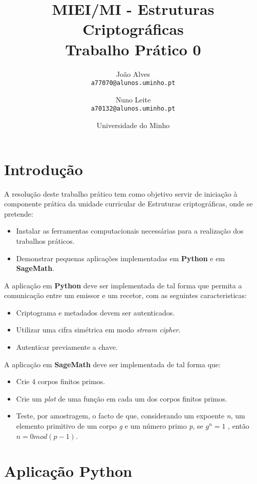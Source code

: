 \documentclass[11pt]{article}
\title{MIEI/MI - Estruturas Criptográficas\\
            \large Trabalho Prático 0}
\author{
        João Alves\\
        \texttt{a77070@alunos.uminho.pt}
        \and
        Nuno Leite\\
        \texttt{a70132@alunos.uminho.pt}
      }
\date{Universidade do Minho}
\begin{document}
    
    
    \maketitle
    
    
    \hypertarget{introduuxe7uxe3o}{%
\section{Introdução}\label{introduuxe7uxe3o}}

    A resolução deste trabalho prático tem como objetivo servir de iniciação
à componente prática da unidade curricular de Estruturas criptográficas,
onde se pretende:
\begin{itemize}
    \item Instalar as ferramentas computacionais necessárias
    para a realização dos trabalhos práticos. 
    \item Demonstrar pequenas
    aplicações implementadas em \textbf{Python} e em \textbf{SageMath}.
\end{itemize}

A aplicação em \textbf{Python} deve ser implementada de tal forma que
permita a comunicação entre um emissor e um recetor, com as seguintes
caracteristicas:
\begin{itemize}
    \item Criptograma e metadados devem ser autenticados.
    \item Utilizar uma cifra simétrica em modo \emph{stream cipher}. 
    \item Autenticar previamente a chave.
\end{itemize}


A aplicação em \textbf{SageMath} deve ser implementada de tal forma que:
\begin{itemize}
    \item Crie 4 corpos finitos primos.
    \item Crie um \emph{plot} de uma função em cada um dos corpos finitos primos. 
    \item Teste, por amostragem, o facto de que, considerando um expoente \emph{n}, um elemento primitivo de um corpo \emph{g} e um número primo \emph{p}, se \(g ^ n = 1\) , então \(n = 0 mod (p-1)\).
\end{itemize}

    \hypertarget{aplicauxe7uxe3o-python}{%
\section{Aplicação Python}\label{aplicauxe7uxe3o-python}}
\end{document}
